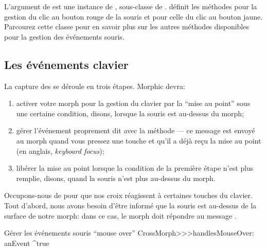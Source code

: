\documentclass[a4paper,10pt,twoside]{book}
\begin{document}
L'argument  de  est une instance de
\mbox{,} sous-classe de .
 d\'efinit les m\'ethodes
 pour la gestion du clic au
bouton rouge de la souris et 
pour celle du clic au bouton jaune. Parcourez cette classe pour
en savoir plus sur les autres m\'ethodes disponibles pour la gestion
des \'ev\'enements souris.

\subsection{Les \'ev\'enements clavier}

La capture des  se d\'eroule en trois
\'etapes. Morphic devra:


\begin{enumerate}
	\item activer votre morph pour la gestion du clavier par la ``mise
      au point'' sous une certaine condition, disons, lorsque la souris est au-dessus du morph; 
	\item g\'erer l'\'ev\'enement proprement dit avec la m\'ethode
       --- ce message est envoy\'e au
      morph quand vous pressez une touche et qu'il a d\'ej\`a re\c{c}u
      la mise au point  (en anglais, \emph{keyboard focus});
	\item lib\'erer la mise au point lorsque la condition de la
      premi\`ere \'etape n'est plus remplie, disons, quand la souris
      n'est plus au-dessus du morph.
\end{enumerate}

Occupons-nous de  pour que nos croix r\'eagissent \`a
certaines touches du clavier. Tout d'abord, nous avons besoin d'\^etre
inform\'e que la souris est au-dessus de la surface de notre morph:
dans ce cas, le morph doit r\'epondre  au message
.


\begin{method}{G\'erer les \'ev\'enements souris ``mouse over''} 
CrossMorph>>>handlesMouseOver: anEvent
	^true
\end{method}
\end{document}
